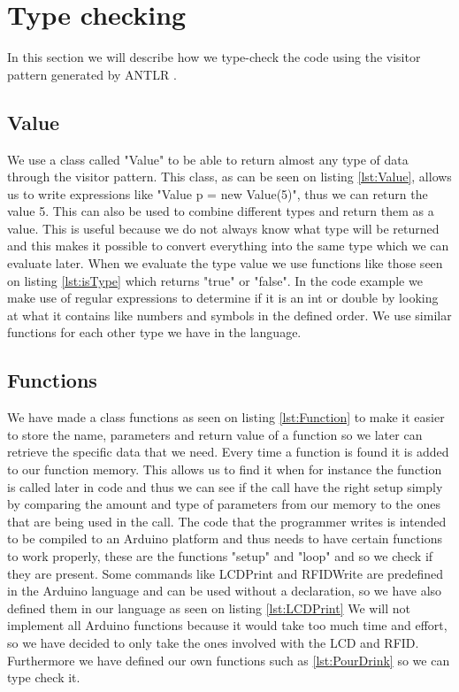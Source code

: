 \section{Type checking}
\label{sec:typecheck}
In this section we will describe how we type-check the code using the visitor pattern generated by ANTLR \citep{ANTLR}.

\subsection*{Value}
We use a class called "Value" to be able to return almost any type of data through the visitor pattern.
This class, as can be seen on listing \ref{lst:Value}, allows us to write expressions like "Value p = new Value(5)", thus we can return the value 5. This can also be used to combine different types and return them as a value. This is useful because we do not always know what type will be returned and this makes it possible to convert everything into the same type which we can evaluate later.
When we evaluate the type value we use functions like those seen on listing \ref{lst:isType} which returns "true" or "false". In the code example we make use of regular expressions to determine if it is an int or double by looking at what it contains like numbers and symbols in the defined order. We use similar functions for each other type we have in the language.

\subsection*{Functions}
We have made a class functions as seen on listing \ref{lst:Function} to make it easier to store the name, parameters and return value of a function so we  later can retrieve the specific data that we need. Every time a function is found it is added to our function memory. This allows us to find it when for instance the function is called later in code and thus we can see if the call have the right setup simply by comparing the amount and type of parameters from our memory to the ones that are being used in the call.
The code that the programmer writes is intended to be compiled to an Arduino platform and thus needs to have certain functions to work properly, these are the functions "setup" and "loop" and so we check if they are present. Some commands like LCDPrint and RFIDWrite are predefined in the Arduino language and can be used without a declaration, so we have also defined them in our language as seen on listing \ref{lst:LCDPrint}
We will not implement all Arduino functions because it would take too much time and effort, so we have decided to only take the ones involved with the LCD and RFID. Furthermore we have defined our own functions such as \ref{lst:PourDrink} so we can type check it.

